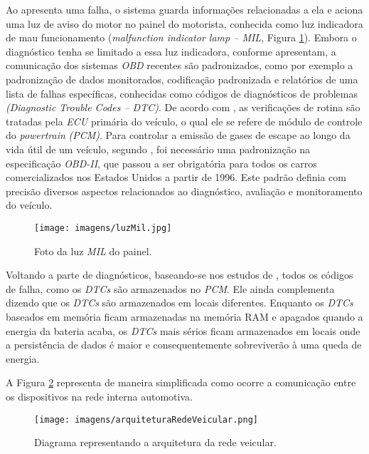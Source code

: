 Ao apresenta uma falha, o sistema guarda informações relacionadas a ela e aciona uma luz de aviso do motor no painel do motorista, conhecida como luz indicadora de mau funcionamento (\textit{malfunction indicator lamp – MIL}, Figura \ref{Fig:luz_mil}). Embora o diagnóstico tenha se limitado a essa luz indicadora, conforme  apresentam, a comunicação dos sistemas \textit{OBD} recentes são padronizados, como por exemplo a padronização de dados monitorados, codificação padronizada e relatórios de uma lista de falhas específicas, conhecidas como códigos de diagnósticos de problemas \textit{(Diagnostic Trouble Codes – DTC)}. De acordo com , as verificações de rotina são tratadas pela \textit{ECU} primária do veículo, o qual ele se refere de módulo de controle do \textit{powertrain} \textit{(PCM)}. Para controlar a emissão de gases de escape ao longo da vida útil de um veículo, segundo , foi necessário uma padronização na especificação \textit{OBD-II}, que passou a ser obrigatória para todos os carros comercializados nos Estados Unidos a partir de 1996. Este padrão definia com precisão diversos aspectos relacionados ao diagnóstico, avaliação e monitoramento do veículo.

\begin{figure}[!ht]
\centering
\caption{Foto da luz \textit{MIL} do painel.} 
{\texttt{[image: imagens/luzMil.jpg]}}\\
 \label{Fig:luz_mil}
\end{figure}

Voltando a parte de diagnósticos, baseando-se nos estudos de , todos os códigos de falha, como os \textit{DTCs} são armazenados no \textit{PCM}. Ele ainda complementa dizendo que os \textit{DTCs} são armazenados em locais diferentes. Enquanto os \textit{DTCs} baseados em memória ficam armazenadas na memória RAM e apagados quando a energia da bateria acaba, os \textit{DTCs} mais sérios ficam armazenados em locais onde a persistência de dados é maior e consequentemente sobreviverão à uma queda de energia.

A Figura \ref{Fig:rede_veicular} representa de maneira simplificada como ocorre a comunicação entre os dispositivos na rede interna automotiva.

\begin{figure}[!ht]
\centering
\caption{Diagrama representando a arquitetura da rede veicular.} 
{\texttt{[image: imagens/arquiteturaRedeVeicular.png]}}\\
 \label{Fig:rede_veicular}
\end{figure}

